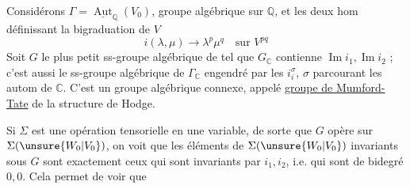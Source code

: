 Considérons $\Gamma=\underline{\operatorname{Aut}}_{\mathbb{Q}}(V_0)$,
groupe algébrique
sur $\mathbb{Q}$, et les deux hom
définissant la bigraduation de $V$
\[
 i(\lambda,\mu)\longrightarrow\lambda^p\mu^q\quad\text{sur }V^{pq}
\]
Soit $G$ le plus petit ss-groupe algébrique de \inserted{$\Gamma$}
tel que $G_{\mathbb{C}}$ contienne $\operatorname{Im}i_1,\operatorname{Im}i_2$ ;
 c'est aussi le ss-groupe algébrique de
$\Gamma_{\mathbb{C}}$ engendré par les $i_i^\sigma$, $\sigma$ parcourant
les  autom de $\mathbb{C}$.
C'est un groupe
algébrique connexe, appelé \uline{groupe de Mumford-Tate}
de la structure de Hodge.


Si $\Sigma$ est
une opération tensorielle en une variable,
de sorte que $G$ opère sur $\Sigma(\unsure{W_0|V_0})$,
on voit que les éléments de $\Sigma(\unsure{W_0|V_0})$ invariants
sous $G$ sont exactement ceux qui sont
invariants par  $i_1,i_2$, i.e. qui sont de
bidegré $0,0$. Cela permet de voir que
